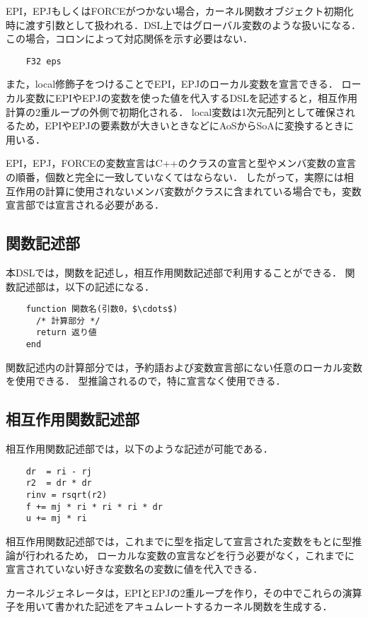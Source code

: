 \documentclass{article}
\begin{document}
EPI，EPJもしくはFORCEがつかない場合，カーネル関数オブジェクト初期化時に渡す引数として扱われる．DSL上ではグローバル変数のような扱いになる．
この場合，コロンによって対応関係を示す必要はない．
\begin{verbatim}
	F32 eps
\end{verbatim}

また，local修飾子をつけることでEPI，EPJのローカル変数を宣言できる．
ローカル変数にEPIやEPJの変数を使った値を代入するDSLを記述すると，相互作用計算の2重ループの外側で初期化される．
local変数は1次元配列として確保されるため，EPIやEPJの要素数が大きいときなどにAoSからSoAに変換するときに用いる．

EPI，EPJ，FORCEの変数宣言はC++のクラスの宣言と型やメンバ変数の宣言の順番，個数と完全に一致していなくてはならない．
したがって，実際には相互作用の計算に使用されないメンバ変数がクラスに含まれている場合でも，変数宣言部では宣言される必要がある．

\subsection{関数記述部}
本DSLでは，関数を記述し，相互作用関数記述部で利用することができる．
関数記述部は，以下の記述になる．
\begin{verbatim}
	function 関数名(引数0，$\cdots$)
	  /* 計算部分 */
	  return 返り値
	end
\end{verbatim}

関数記述内の計算部分では，予約語および変数宣言部にない任意のローカル変数を使用できる．
型推論されるので，特に宣言なく使用できる．

\subsection{相互作用関数記述部} \label{subsec:kernel}
相互作用関数記述部では，以下のような記述が可能である．
\begin{verbatim}
	dr  = ri - rj
	r2  = dr * dr
	rinv = rsqrt(r2)
	f += mj * ri * ri * ri * dr
	u += mj * ri
\end{verbatim}

相互作用関数記述部では，これまでに型を指定して宣言された変数をもとに型推論が行われるため，
ローカルな変数の宣言などを行う必要がなく，これまでに宣言されていない好きな変数名の変数に値を代入できる．

カーネルジェネレータは，EPIとEPJの2重ループを作り，その中でこれらの演算子を用いて書かれた記述をアキュムレートするカーネル関数を生成する．
\end{document}
